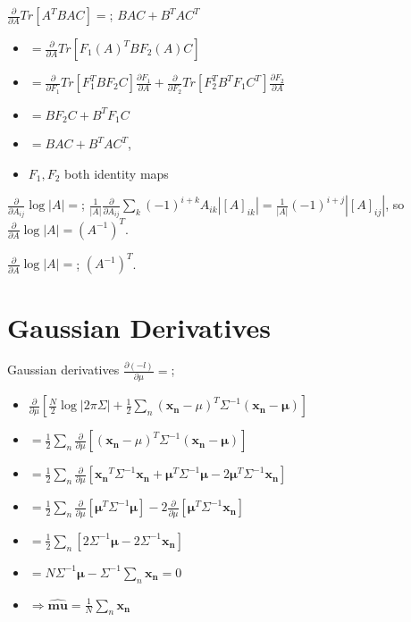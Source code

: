 \documentclass{article}
\begin{document}
$\frac{\partial}{\partial A}Tr[A^TBAC] =$; $BAC+B^TAC^T$ \begin{itemize} \item $=\frac{\partial}{\partial A}Tr[F_1(A)^TBF_2(A)C]$ \item $= \frac{\partial}{\partial F_1}Tr[F_1^TBF_2C]\frac{\partial F_1}{\partial A} + \frac{\partial}{\partial F_2}Tr[F_2^TB^TF_1C^T]\frac{\partial F_2}{\partial A}$ \item $= BF_2C+B^TF_1C$ \item $= BAC+B^TAC^T$, \item $F_1, F_2$ both identity maps \end{itemize} 

$\frac{\partial}{\partial A_{ij}}\log|A|=$; $\frac{1}{|A|}\frac{\partial}{\partial A_{ij}}\sum_{k}(-1)^{i+k}A_{ik}|[A]_{ik}|=\frac{1}{|A|}(-1)^{i+j}|[A]_{ij}|$, so \newline $\frac{\partial}{\partial A}\log|A| = (A^{-1})^T$.

$\frac{\partial}{\partial A}\log|A| =$; $(A^{-1})^T$.

\section{Gaussian Derivatives} 

Gaussian derivatives $\frac{\partial(-l)}{\partial\mu}= $; \begin{itemize} \item $\frac{\partial}{\partial\mu}[\frac{N}{2}\log|2\pi\Sigma|+\frac{1}{2}\sum_n(\mathbf{x_n}-\mu)^T\Sigma^{-1}(\mathbf{x_n-\mu})]$ \item $=\frac{1}{2}\sum_n\frac{\partial}{\partial\mu}[ (\mathbf{x_n}-\mu)^T\Sigma^{-1}(\mathbf{x_n-\mu})]$ \item $=\frac{1}{2}\sum_n\frac{\partial}{\partial\mu}[\mathbf{x_n}^T\Sigma^{-1}\mathbf{x_n}+\mathbf{\mu}^T\Sigma^{-1}\mathbf{\mu}-2\mathbf{\mu}^T\Sigma^{-1}\mathbf{x_n}]$ \item $=\frac{1}{2}\sum_n\frac{\partial}{\partial\mu}[\mathbf{\mu}^T\Sigma^{-1}\mathbf{\mu}] - 2\frac{\partial}{\partial\mu}[\mathbf{\mu}^T\Sigma^{-1}\mathbf{x_n}]$  \item $=\frac{1}{2}\sum_n[2\Sigma^{-1}\mathbf{\mu} - 2\Sigma^{-1}\mathbf{x_n}]$ \item $=N\Sigma^{-1}\mathbf{\mu} - \Sigma^{-1}\sum_n\mathbf{x_n}=0$ \item $\Rightarrow \hat{\mathbf{mu}} = \frac{1}{N}\sum_n\mathbf{x_n}$ \end{itemize} 
\end{document}
